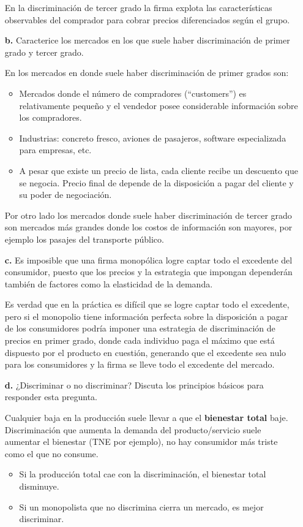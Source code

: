 \begin{itemize}
\begin{solution}
        En la discriminación de tercer grado la firma explota las características observables del comprador para cobrar precios diferenciados según el grupo. 
    \end{solution}
    \item[\textbf{b.}] Caracterice los mercados en los que suele haber discriminación de primer grado y tercer grado. 
    \begin{solution}
        En los mercados en donde suele haber discriminación de primer grados son:
        \begin{itemize}
            \item Mercados donde el número de compradores (“customers”) es relativamente pequeño y el vendedor posee considerable información sobre los compradores.
            \item Industrias: concreto fresco, aviones de pasajeros, software especializada para empresas, etc.
            \item A pesar que existe un precio de lista, cada cliente recibe un descuento que se negocia. Precio final de depende de la disposición a pagar del cliente y su poder de negociación.
        \end{itemize}
        Por otro lado los mercados donde suele haber discriminación de tercer grado son mercados más grandes donde los costos de información son mayores, por ejemplo los pasajes del transporte público. 
    \end{solution}
    \item[\textbf{c.}] Es imposible que una firma monopólica logre captar todo el excedente del consumidor, puesto que los precios y la estrategia que impongan dependerán también de factores como la elasticidad de la demanda.
    \begin{solution}
        Es verdad que en la práctica es difícil que se logre captar todo el excedente, pero si el monopolio tiene información perfecta sobre la disposición a pagar de los consumidores podría imponer una estrategia de discriminación de precios en primer grado, donde cada individuo paga el máximo que está dispuesto por el producto en cuestión, generando que el excedente sea nulo para los consumidores y la firma se lleve todo el excedente del mercado.
    \end{solution}
    \item[\textbf{d.}] ¿Discriminar o no discriminar? Discuta los principios básicos para responder esta pregunta.
    \begin{solution}
    Cualquier baja en la producción suele llevar a que el \textbf{bienestar total} baje. Discriminación que aumenta la demanda del producto/servicio suele aumentar el bienestar (TNE por ejemplo), no hay consumidor más triste como el que no consume. 
        \begin{itemize}
            \item Si la producción total cae con la discriminación, el bienestar total disminuye.
            \item Si un monopolista que no discrimina cierra un mercado, es mejor discriminar.
        \end{itemize}
    \end{solution}
    \end{itemize}

